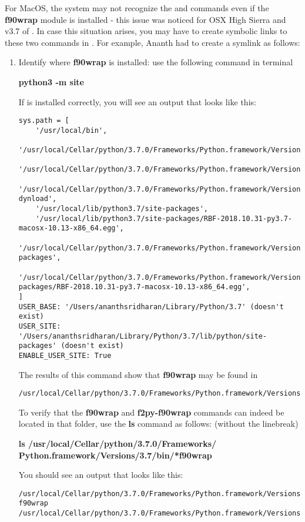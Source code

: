 For MacOS, the system may not recognize the   and  commands even if the \textbf{f90wrap} module is installed - this issue was noticed for OSX High Sierra and v3.7 of \python. In case this situation arises, you may have to create symbolic links to these two commands in . For example, Ananth had to create a symlink as follows:

\begin{enumerate}
\item Identify where \textbf{f90wrap} is installed: use the following command in terminal
\begin{center}
\textbf{python3 -m site}\\
\end{center}
If  is installed correctly, you will see an output that looks like this: \\
\begin{lstlisting}
sys.path = [
    '/usr/local/bin',
    '/usr/local/Cellar/python/3.7.0/Frameworks/Python.framework/Versions/3.7/lib/python37.zip',
    '/usr/local/Cellar/python/3.7.0/Frameworks/Python.framework/Versions/3.7/lib/python3.7',
    '/usr/local/Cellar/python/3.7.0/Frameworks/Python.framework/Versions/3.7/lib/python3.7/lib-dynload',
    '/usr/local/lib/python3.7/site-packages',
    '/usr/local/lib/python3.7/site-packages/RBF-2018.10.31-py3.7-macosx-10.13-x86_64.egg',
    '/usr/local/Cellar/python/3.7.0/Frameworks/Python.framework/Versions/3.7/lib/python3.7/site-packages',
    '/usr/local/Cellar/python/3.7.0/Frameworks/Python.framework/Versions/3.7/lib/python3.7/site-packages/RBF-2018.10.31-py3.7-macosx-10.13-x86_64.egg',
]
USER_BASE: '/Users/ananthsridharan/Library/Python/3.7' (doesn't exist)
USER_SITE: '/Users/ananthsridharan/Library/Python/3.7/lib/python/site-packages' (doesn't exist)
ENABLE_USER_SITE: True
\end{lstlisting}

The results of this command show that \textbf{f90wrap} may be found in
\begin{lstlisting}
/usr/local/Cellar/python/3.7.0/Frameworks/Python.framework/Versions/3.7/bin/
\end{lstlisting}

To verify that the \textbf{f90wrap} and \textbf{f2py-f90wrap} commands can indeed be located in that folder, use the \textbf{ls} command as follows: (without the linebreak)
\begin{center}
\textbf{ls /usr/local/Cellar/python/3.7.0/Frameworks/\\
Python.framework/Versions/3.7/bin/*f90wrap}
\end{center}
You should see an output that looks like this:
\begin{lstlisting}
/usr/local/Cellar/python/3.7.0/Frameworks/Python.framework/Versions/3.7/bin/f2py-f90wrap
/usr/local/Cellar/python/3.7.0/Frameworks/Python.framework/Versions/3.7/bin/f90wrap
\end{lstlisting}


\end{enumerate}
